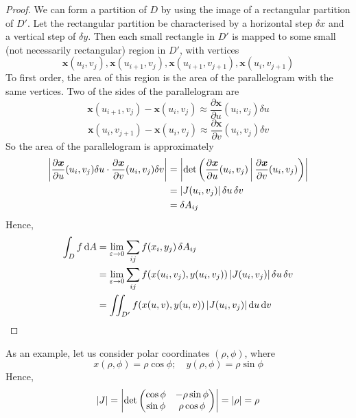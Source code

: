 \documentclass{article}
\begin{document}
\begin{proof}
    We can form a partition of $D$ by using the image of a rectangular partition of $D'$. Let the rectangular partition be characterised by a horizontal step $\delta x$ and a vertical step of $\delta y$. Then each small rectangle in $D'$ is mapped to some small (not necessarily rectangular) region in $D'$, with vertices
    \[ \bm x(u_i, v_j), \bm x(u_{i+1}, v_j), \bm x(u_{i+1}, v_{j+1}), \bm x(u_i, v_{j+1}) \]
    To first order, the area of this region is the area of the parallelogram with the same vertices. Two of the sides of the parallelogram are
    \[ \bm x(u_{i+1}, v_j) - \bm x(u_i, v_j) \approx \frac{\partial \bm x}{\partial u}(u_i, v_j) \delta u \]
    \[ \bm x(u_i, v_{j+1}) - \bm x(u_i, v_j) \approx \frac{\partial \bm x}{\partial v}(u_i, v_j) \delta v \]
    So the area of the parallelogram is approximately
    \begin{align*}
        \abs{\frac{\partial \bm x}{\partial u}(u_i, v_j) \delta u \cdot \frac{\partial \bm x}{\partial v}(u_i, v_j) \delta v} & = \abs{\det \left( \frac{\partial \bm x}{\partial u}(u_i, v_j) \,\middle|\, \frac{\partial \bm x}{\partial v}(u_i, v_j) \right)} \\
                                                                                                                              & = \abs{J(u_i, v_j)} \,\delta u \,\delta v                                                                                        \\
                                                                                                                              & = \delta A_{ij}
    \end{align*}
    Hence,
    \begin{align*}
        \int_D f \, \dd A & = \lim_{\varepsilon \to 0} \sum_{ij} f(x_i, y_j)\,\delta A_{ij}                                           \\
                          & = \lim_{\varepsilon \to 0} \sum_{ij} f(x(u_i, v_j), y(u_i, v_j)) \,\abs{J(u_i, v_j)} \,\delta u\,\delta v \\
                          & = \iint_{D'} f(x(u, v), y(u, v)) \,\abs{J(u_i, v_j)} \,\dd u \,\dd v
    \end{align*}
\end{proof}
\noindent As an example, let us consider polar coordinates $(\rho, \phi)$, where
\[ x(\rho, \phi) = \rho \cos \phi;\quad y(\rho, \phi) = \rho \sin \phi \]
Hence,
\[ \abs{J} = \abs{\det \begin{pmatrix}
            \cos \phi & -\rho \sin \phi \\
            \sin \phi & \rho \cos \phi
        \end{pmatrix}} = \abs{\rho} = \rho \]
\end{document}
